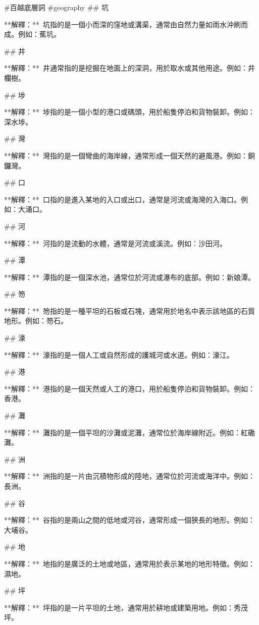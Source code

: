 #百越底層詞 #geography
## 坑

**解釋：** 坑指的是一個小而深的窪地或溝渠，通常由自然力量如雨水沖刷而成。例如：蕉坑。

  

## 井

**解釋：** 井通常指的是挖掘在地面上的深洞，用於取水或其他用途。例如：井欄樹。

  

## 埗

**解釋：** 埗指的是一個小型的港口或碼頭，用於船隻停泊和貨物裝卸。例如：深水埗。  

## 灣

**解釋：** 灣指的是一個彎曲的海岸線，通常形成一個天然的避風港。例如：銅鑼灣。  

## 口

**解釋：** 口指的是進入某地的入口或出口，通常是河流或海灣的入海口。例如：大涌口。  

## 河

**解釋：** 河指的是流動的水體，通常是河流或溪流。例如：沙田河。  

## 潭

**解釋：** 潭指的是一個深水池，通常位於河流或瀑布的底部。例如：新娘潭。  

## 笏

**解釋：** 笏指的是一種平坦的石板或石塊，通常用於地名中表示該地區的石質地形。例如：笏石。  

## 濠

**解釋：** 濠指的是一個人工或自然形成的護城河或水道。例如：濠江。  

## 港

**解釋：** 港指的是一個天然或人工的港口，用於船隻停泊和貨物裝卸。例如：香港。  

## 灘

**解釋：** 灘指的是一個平坦的沙灘或泥灘，通常位於海岸線附近。例如：紅磡灘。  

## 洲

**解釋：** 洲指的是一片由沉積物形成的陸地，通常位於河流或海洋中。例如：長洲。  

## 谷

**解釋：** 谷指的是兩山之間的低地或河谷，通常形成一個狹長的地形。例如：大埔谷。  

## 地

**解釋：** 地指的是廣泛的土地或地區，通常用於表示某地的地形特徵。例如：濕地。  

## 坪

**解釋：** 坪指的是一片平坦的土地，通常用於耕地或建築用地。例如：秀茂坪。  

